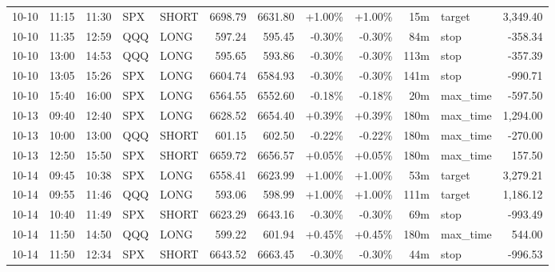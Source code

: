 \documentclass[11pt,a4paper,twoside]{article}
\begin{document}
\begin{center}
\begin{longtable}{>{\color{txtmain}}l l l l l r r r r r >{\color{txtmain}}l r}
10-10 & 11:15 & 11:30 & SPX & SHORT & 6698.79 & 6631.80 & \textcolor{wingreen}{+1.00\%} & \textcolor{wingreen}{+1.00\%} & 15m & target & \textcolor{wingreen}{3,349.40} \\
10-10 & 11:35 & 12:59 & QQQ & LONG & 597.24 & 595.45 & \textcolor{lossred}{-0.30\%} & \textcolor{lossred}{-0.30\%} & 84m & stop & \textcolor{lossred}{-358.34} \\
10-10 & 13:00 & 14:53 & QQQ & LONG & 595.65 & 593.86 & \textcolor{lossred}{-0.30\%} & \textcolor{lossred}{-0.30\%} & 113m & stop & \textcolor{lossred}{-357.39} \\
10-10 & 13:05 & 15:26 & SPX & LONG & 6604.74 & 6584.93 & \textcolor{lossred}{-0.30\%} & \textcolor{lossred}{-0.30\%} & 141m & stop & \textcolor{lossred}{-990.71} \\
10-10 & 15:40 & 16:00 & SPX & LONG & 6564.55 & 6552.60 & \textcolor{lossred}{-0.18\%} & \textcolor{lossred}{-0.18\%} & 20m & max\_time & \textcolor{lossred}{-597.50} \\
10-13 & 09:40 & 12:40 & SPX & LONG & 6628.52 & 6654.40 & \textcolor{wingreen}{+0.39\%} & \textcolor{wingreen}{+0.39\%} & 180m & max\_time & \textcolor{wingreen}{1,294.00} \\
10-13 & 10:00 & 13:00 & QQQ & SHORT & 601.15 & 602.50 & \textcolor{lossred}{-0.22\%} & \textcolor{lossred}{-0.22\%} & 180m & max\_time & \textcolor{lossred}{-270.00} \\
10-13 & 12:50 & 15:50 & SPX & SHORT & 6659.72 & 6656.57 & \textcolor{wingreen}{+0.05\%} & \textcolor{wingreen}{+0.05\%} & 180m & max\_time & \textcolor{wingreen}{157.50} \\
10-14 & 09:45 & 10:38 & SPX & LONG & 6558.41 & 6623.99 & \textcolor{wingreen}{+1.00\%} & \textcolor{wingreen}{+1.00\%} & 53m & target & \textcolor{wingreen}{3,279.21} \\
10-14 & 09:55 & 11:46 & QQQ & LONG & 593.06 & 598.99 & \textcolor{wingreen}{+1.00\%} & \textcolor{wingreen}{+1.00\%} & 111m & target & \textcolor{wingreen}{1,186.12} \\
10-14 & 10:40 & 11:49 & SPX & SHORT & 6623.29 & 6643.16 & \textcolor{lossred}{-0.30\%} & \textcolor{lossred}{-0.30\%} & 69m & stop & \textcolor{lossred}{-993.49} \\
10-14 & 11:50 & 14:50 & QQQ & LONG & 599.22 & 601.94 & \textcolor{wingreen}{+0.45\%} & \textcolor{wingreen}{+0.45\%} & 180m & max\_time & \textcolor{wingreen}{544.00} \\
10-14 & 11:50 & 12:34 & SPX & SHORT & 6643.52 & 6663.45 & \textcolor{lossred}{-0.30\%} & \textcolor{lossred}{-0.30\%} & 44m & stop & \textcolor{lossred}{-996.53} \\

\end{longtable}
\end{center}
\end{document}
